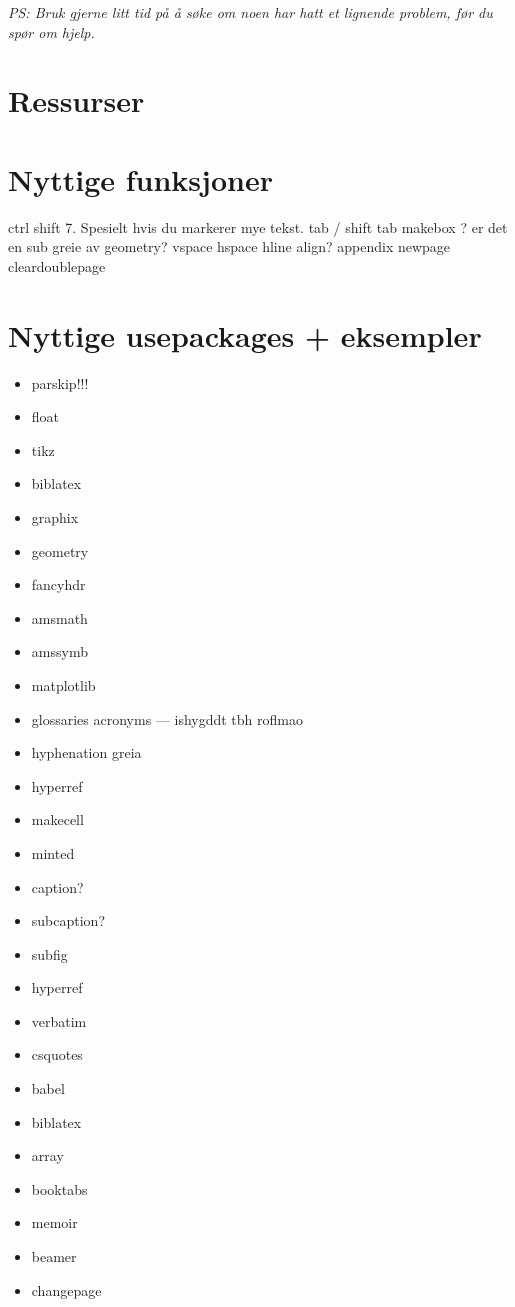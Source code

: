     \textit{PS: Bruk gjerne litt tid på å søke om noen har hatt et lignende problem, før du spør om hjelp.}

\section{Ressurser}
    

\section{Nyttige funksjoner}
    ctrl shift 7. Spesielt hvis du markerer mye tekst.
    tab / shift tab
    makebox ? er det en sub greie av geometry?
    vspace
    hspace
    hline
    align?
    appendix
    newpage
    cleardoublepage
    

\section{Nyttige usepackages + eksempler}
\begin{itemize}
    \item parskip!!!
    \item float
    \item tikz
    \item biblatex
    \item graphix
    \item geometry %
    \item fancyhdr
    \item amsmath
    \item amssymb
    \item matplotlib
    \item glossaries acronyms --- ishygddt tbh roflmao
    \item hyphenation greia
    \item hyperref
    \item makecell
    \item minted
    \item caption?
    \item subcaption?
    \item subfig
    \item hyperref %
    \item verbatim %
    \item csquotes %
    \item babel %
    \item biblatex 
    \item array
    \item booktabs
    \item memoir
    \item beamer
    \item changepage
\end{itemize}

